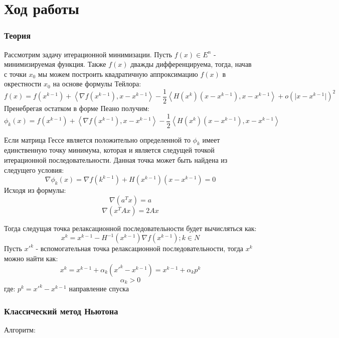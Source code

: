 \documentclass[a4paper, 14pt]{article}
\begin{document}
	\section*{Ход работы}
		\subsubsection*{Теория}
		Рассмотрим задачу итерационной минимизации. Пусть $f(x) \in E^n$ - минимизируемая функция. Также $f(x)$ дважды дифференцируема, тогда, начав с точки $x_0$ мы можем построить квадратичную аппроксимацию $f(x)$ в окрестности $x_0$ на основе формулы Тейлора:
		\[
		f(x)  = f(x^{k-1}) + \left\langle \nabla f(x^{k-1}), x - x^{k-1}\right\rangle
		- \frac{1}{2} \left\langle H(x^{k})(x - x^{k-1}), x - x^{k-1} \right\rangle + 
		o(\vert x - x^{k-1} \vert)^2
		\]
		Пренебрегая остатком в форме Пеано получим:
		\[
		\phi_k(x)  = f(x^{k-1}) + \left\langle \nabla f(x^{k-1}), x - x^{k-1}\right\rangle
		- \frac{1}{2} \left\langle H(x^{k})(x - x^{k-1}), x - x^{k-1} \right\rangle 
		\]
		
		Если матрица Гессе является положительно определенной то $\phi_k$ имеет единственную точку минимума, которая и является следущей точкой итерационной последовательности. Данная точка может быть найдена из следущего условия:
		\[
		\nabla \phi_k(x) = \nabla f(k^{k-1}) + H(x^{k-1})(x - x^{k-1}) = 0		
		\]
		Исходя из формулы:
		\[
		\nabla(a^Tx) = a\]\[
		\nabla (x^TAx) = 2Ax		
		\]
		
		Тогда следущая точка релаксационной последовательности будет вычисляться как:
		\[
			x^k = x^{k-1} - H^{-1}(x^{k-1}) \nabla f(x^{k-1}); k \in N		
		\]
		Пусть $x'^k$ - вспомогательная точка релаксационной последовательности, тогда $x^k$ можно найти как:
		\[
			x^k = x^{k-1} +\alpha_k(x'^{k} - x^{k-1}) = x^{k-1} + \alpha_kp^k 	
		\]\[
		\alpha_k > 0\]
		где: $
		p^k= x'^k - x^{k - 1}$
		направление спуска 

	\subsubsection*{Классический метод Ньютона}
	
	Алгоритм:
	
\end{document}
